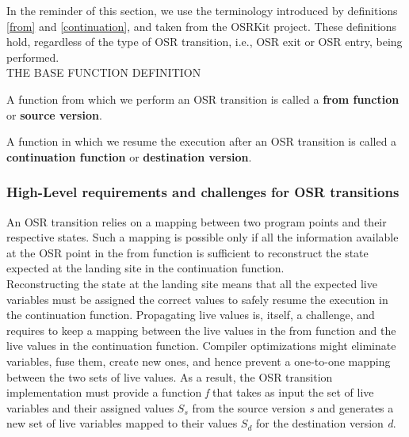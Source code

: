 In the reminder of this section, we use the terminology introduced by definitions \ref{from} and \ref{continuation}, and taken from the OSRKit\cite{OSRKit} project.
These definitions hold, regardless of the type of OSR transition, i.e., OSR exit or OSR entry, being performed.\\

THE BASE FUNCTION DEFINITION\\

\begin{definition}\label{from}
A function from which we perform an OSR transition is called a \textbf{from function} or \textbf{source version}.
\end{definition}

\begin{definition}\label{continuation}
A function in which we resume the execution after an OSR transition is called a \textbf{continuation function} or \textbf{destination version}.
\end{definition}

\subsubsection{High-Level requirements and challenges for OSR transitions}\label{HLREQ}

An OSR transition relies on a mapping between two program points and their respective states.
Such a mapping is possible only if all the information available at the OSR point in the from function is sufficient to reconstruct the state expected at the landing site in the continuation function.\\

Reconstructing the state at the landing site means that all the expected live variables must be assigned the correct values to safely resume the execution in the continuation function.
Propagating live values is, itself, a challenge, and requires to keep a mapping between the live values in the from function and the live values in the continuation function.
Compiler optimizations might eliminate variables, fuse them, create new ones, and hence prevent a one-to-one mapping between the two sets of live values. 
As a result, the OSR transition implementation must provide a function \textit{f} that takes as input the set of live variables and their assigned values $S_s$ from the source version \textit{s} and generates a new set of live variables mapped to their values $S_d$ for the destination version \textit{d}.

